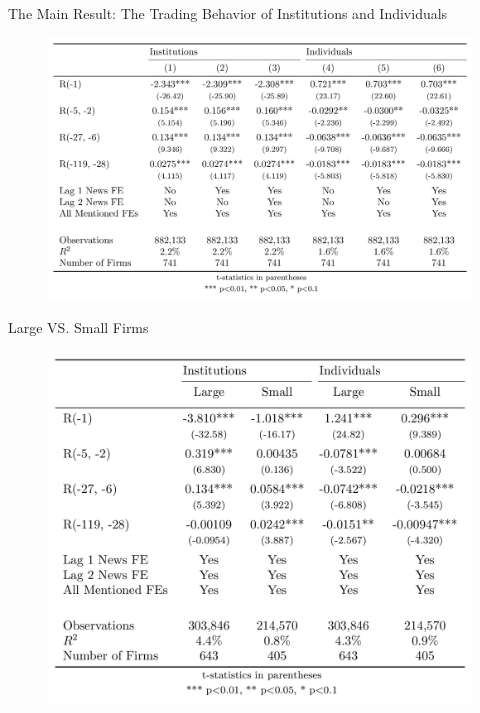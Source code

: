 \documentclass{beamer}
\begin{document}
\begin{frame}{}
    \begin{block}{The Main Result: The Trading Behavior of Institutions and Individuals}
        \begin{figure}
            \includegraphics[width=\textwidth]{v5.png}
        \end{figure}
    \end{block}
\end{frame}



\begin{frame}{Large VS. Small Firms}
    \begin{figure}
        \includegraphics[scale = .2]{size.png}
    \end{figure}
\end{frame}
\end{document}
